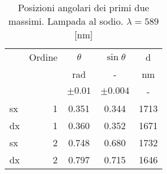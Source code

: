\begin{table}[H]
    \begin{center}
    \begin{tabular}{|l r|c|c|c|}
    \hline
            &   Ordine  &   $\theta$    & $\sin\theta$  &   d   \\
            &           &   rad         &   -           &   nm  \\
            &           &   $\pm0.01$   &   $\pm 0.004$ &   -   \\
        \hline
        sx  &   1       & 0.351         & 0.344         & 1713 \\ 
        dx  &   1       & 0.360         & 0.352         & 1671 \\ 
        \hline
        sx  &   2       & 0.748         & 0.680         & 1732 \\ 
        dx  &   2       & 0.797         & 0.715         & 1646 \\ 
        \hline
    \end{tabular}
    \end{center}
    \caption{ Posizioni angolari dei primi due massimi. Lampada al sodio. $\lambda = 589$ [nm] }
    \label{O3_P1_d}
\end{table}